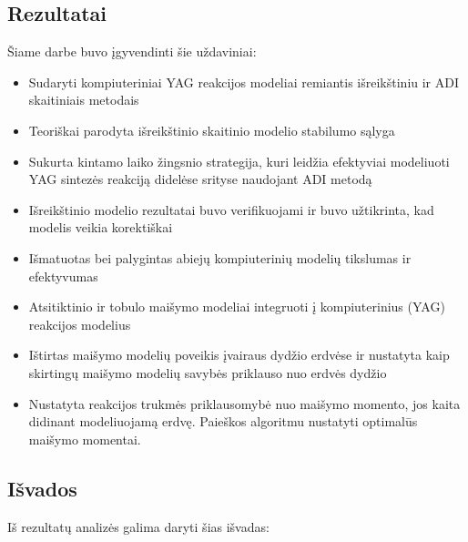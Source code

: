 
\subsection*{Rezultatai}

Šiame darbe buvo įgyvendinti šie uždaviniai:

\begin{itemize}
    \item Sudaryti kompiuteriniai YAG reakcijos modeliai remiantis išreikštiniu ir ADI skaitiniais metodais
    \item Teoriškai parodyta išreikštinio skaitinio modelio stabilumo sąlyga
    \item Sukurta kintamo laiko žingsnio strategija, kuri leidžia efektyviai modeliuoti YAG sintezės reakciją didelėse srityse naudojant ADI metodą
    \item Išreikštinio modelio rezultatai buvo verifikuojami ir buvo užtikrinta, kad modelis veikia korektiškai 
    \item Išmatuotas bei palygintas abiejų kompiuterinių modelių tikslumas ir efektyvumas
    \item Atsitiktinio ir tobulo maišymo modeliai integruoti į kompiuterinius (YAG) reakcijos modelius
    \item Ištirtas maišymo modelių poveikis įvairaus dydžio erdvėse ir nustatyta kaip skirtingų maišymo modelių savybės priklauso nuo erdvės dydžio
    \item Nustatyta reakcijos trukmės priklausomybė nuo maišymo momento, jos kaita didinant modeliuojamą erdvę. Paieškos algoritmu nustatyti optimalūs maišymo momentai.
\end{itemize}

\subsection*{Išvados}

Iš rezultatų analizės galima daryti šias išvadas:

